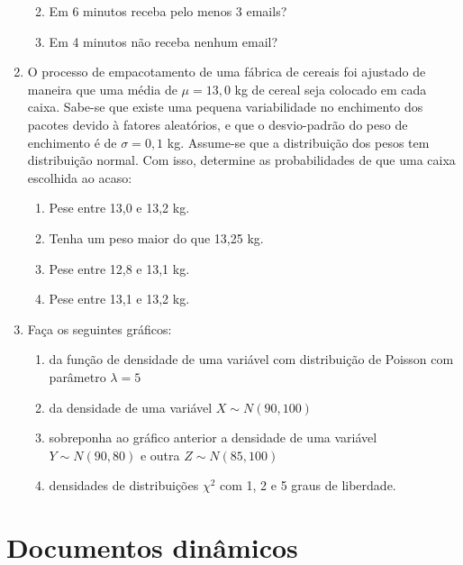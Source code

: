 \documentclass[10pt,a4paper]{book}
\providecommand{\tightlist}{%
  \setlength{\itemsep}{0pt}\setlength{\parskip}{0pt}}
\begin{document}
\begin{enumerate}
  \begin{enumerate}
  \def\labelenumii{\alph{enumii}.}
  \tightlist
  \item
    Em 6 minutos receba pelo menos 3 emails?
  \item
    Em 4 minutos não receba nenhum email?
  \end{enumerate}
\item
  O processo de empacotamento de uma fábrica de cereais foi ajustado de
  maneira que uma média de \(\mu = 13,0\) kg de cereal seja colocado em
  cada caixa. Sabe-se que existe uma pequena variabilidade no enchimento
  dos pacotes devido à fatores aleatórios, e que o desvio-padrão do peso
  de enchimento é de \(\sigma = 0,1\) kg. Assume-se que a distribuição
  dos pesos tem distribuição normal. Com isso, determine as
  probabilidades de que uma caixa escolhida ao acaso:

  \begin{enumerate}
  \def\labelenumii{\alph{enumii}.}
  \tightlist
  \item
    Pese entre 13,0 e 13,2 kg.
  \item
    Tenha um peso maior do que 13,25 kg.
  \item
    Pese entre 12,8 e 13,1 kg.
  \item
    Pese entre 13,1 e 13,2 kg.
  \end{enumerate}
\item
  Faça os seguintes gráficos:

  \begin{enumerate}
  \def\labelenumii{\alph{enumii}.}
  \tightlist
  \item
    da função de densidade de uma variável com distribuição de Poisson
    com parâmetro \(\lambda = 5\)
  \item
    da densidade de uma variável \(X \sim N(90, 100)\)
  \item
    sobreponha ao gráfico anterior a densidade de uma variável
    \(Y \sim N(90, 80)\) e outra \(Z \sim N(85, 100)\)
  \item
    densidades de distribuições \(\chi^2\) com 1, 2 e 5 graus de
    liberdade.
  \end{enumerate}
\end{enumerate}

\appendix


\chapter{Documentos dinâmicos}\label{documentos-dinamicos}
\end{document}
